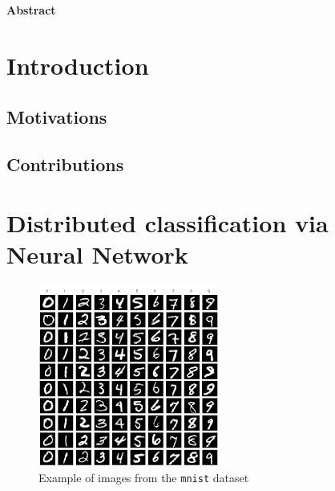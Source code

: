 \documentclass[a4paper,11pt,oneside]{book}
\begin{document}
\newpage
\thispagestyle{empty}

\begin{center}
\chapter*{}
\thispagestyle{empty}
{\Huge \textbf{Abstract}}\\
\vspace{15mm}
\end{center}

\tableofcontents \thispagestyle{empty}

\chapter*{Introduction}
\section*{Motivations} 

\section*{Contributions}



\chapter{Distributed classification via Neural Network}

\begin{figure}
	\centering
	\includegraphics[scale=0.5]{mnist}
	\caption{Example of images from the \texttt{mnist} dataset}
	\label{mnist}
\end{figure}
\end{document}
